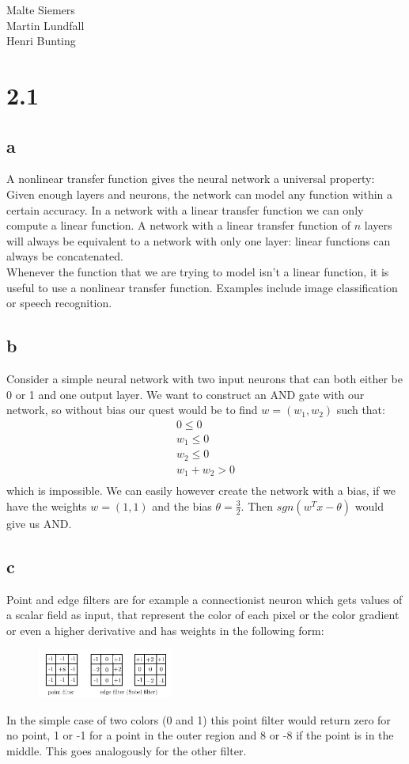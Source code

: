 \documentclass[11pt,a4paper]{article}
\begin{document}
Malte Siemers\\
Martin Lundfall\\
Henri Bunting\\
\section*{2.1}
\subsection*{a}
A nonlinear transfer function gives the neural network a universal property: Given enough layers and neurons, the network can model any function within a certain accuracy. In a network with a linear transfer function we can only compute a linear function. A network with a linear transfer function of $n$ layers will always be equivalent to a network with only one layer: linear functions can always be concatenated.\\
Whenever the function that we are trying to model isn't a linear function, it is useful to use a nonlinear transfer function.
Examples include image classification or speech recognition.
\subsection*{b}
Consider a simple neural network with two input neurons that can both either be 0 or 1 and one output layer. We want to construct an AND gate with our network, so without bias our quest would be to find $w = (w_1, w_2)$ such that:
\begin{align*}
  0 \leq 0\\
  w_1 \leq 0\\
  w_2 \leq 0\\
  w_1 + w_2 > 0\\
\end{align*}
which is impossible. We can easily however create the network with a bias, if we have the weights $w = (1, 1)$ and the bias
$\theta = \frac{3}{2}$. Then $sgn(w^Tx - \theta)$ would give us AND.
\subsection*{c}
Point and edge filters are for example a connectionist neuron which gets values of a scalar field as input, that
represent the color of each pixel or the color gradient or even a higher derivative and has weights in the following form:
\begin{figure}[h]
\centering
 \includegraphics[width=0.4\textwidth]{./point_edge.png}
\end{figure}
In the simple case of two colors (0 and 1) this point filter would return zero for no point, 1 or -1 for a point in the outer
region and 8 or -8 if the point is in the middle. This goes analogously for the other filter.
\end{document}
